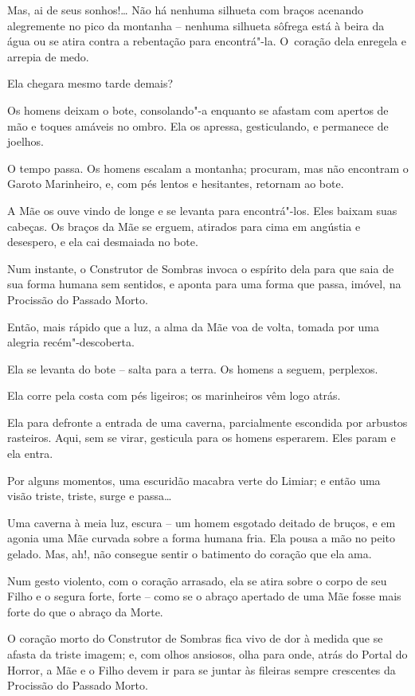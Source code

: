 Mas, ai de seus sonhos!\ldots{} Não há nenhuma silhueta com braços acenando
alegremente no pico da montanha -- nenhuma silhueta sôfrega está à
beira da água ou se atira contra a rebentação para encontrá"-la. O~coração dela enregela e arrepia de medo.

Ela chegara mesmo tarde demais?

Os homens deixam o bote, consolando"-a enquanto se afastam com apertos de mão
e toques amáveis no ombro. Ela os apressa, gesticulando, e permanece de
joelhos.

\smallskip
O tempo passa. Os homens escalam a montanha; procuram, mas não encontram
o Garoto Marinheiro, e, com pés lentos e hesitantes, retornam ao bote.

\smallskip
A Mãe os ouve vindo de longe e se levanta para encontrá"-los. Eles baixam
suas cabeças. Os braços da Mãe se erguem, atirados para cima em angústia
e desespero, e ela cai desmaiada no bote.

Num instante, o Construtor de Sombras invoca o espírito dela para que
saia de sua forma humana sem sentidos, e aponta para uma forma que
passa, imóvel, na Procissão do Passado Morto.

Então, mais rápido que a luz, a alma da Mãe voa de volta, tomada
por uma alegria recém"-descoberta.

Ela se levanta do bote -- salta para a terra. Os homens a seguem,
perplexos.

Ela corre pela costa com pés ligeiros; os marinheiros vêm logo atrás.

Ela para defronte a entrada de uma caverna, parcialmente escondida por
arbustos rasteiros. Aqui, sem se virar, gesticula para os homens
esperarem. Eles param e ela entra.

\smallskip
Por alguns momentos, uma escuridão macabra verte do Limiar; e então uma
visão triste, triste, surge e passa\ldots{}

Uma caverna à meia luz, escura -- um homem esgotado deitado de bruços, e em agonia
uma Mãe curvada sobre a forma humana fria. Ela pousa a mão no peito gelado. Mas, ah!, não consegue sentir o batimento do coração
que ela ama.

Num gesto violento, com o coração arrasado, ela se atira sobre o corpo
de seu Filho e o segura forte, forte -- como se o abraço apertado de uma
Mãe fosse mais forte do que o abraço da Morte.

\smallskip
O coração morto do Construtor de Sombras fica vivo de dor à medida que
se afasta da triste imagem; e, com olhos ansiosos, olha para onde, atrás
do Portal do Horror, a Mãe e o Filho devem ir para se juntar às fileiras
sempre crescentes da Procissão do Passado Morto.

